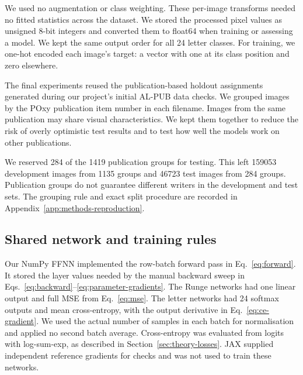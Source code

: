 We used no augmentation or class weighting. These per-image transforms
needed no fitted statistics across the dataset. We stored the processed pixel values as unsigned 8-bit integers and
converted them to float64 when training or assessing a model. We kept the
same output order for all 24 letter classes. For training, we one-hot encoded each image's target: a vector with one
at its class position and zero elsewhere.

The final experiments reused the publication-based holdout assignments
generated during our project's initial AL-PUB data checks. We grouped images by the POxy publication item
number in each filename. Images from the same publication may share visual
characteristics. We kept them together to reduce the risk of overly
optimistic test results and to test how well the models work on other
publications.

We reserved 284 of the 1419 publication groups for testing. This left
159053 development images from 1135 groups and 46723 test images from
284 groups. Publication groups do not guarantee different writers in the
development and test sets. The grouping rule and exact split procedure
are recorded in Appendix~\ref{app:methods-reproduction}.

\subsection{Shared network and training rules}
Our NumPy FFNN implemented the row-batch forward pass in
Eq.~\eqref{eq:forward}. It stored the layer values needed by the manual
backward sweep in Eqs.~\eqref{eq:backward}--\eqref{eq:parameter-gradients}.
The Runge networks had one linear output and full MSE from
Eq.~\eqref{eq:mse}. The letter networks had 24 softmax outputs and
mean cross-entropy, with the output derivative in
Eq.~\eqref{eq:ce-gradient}. We used the actual number of samples in each
batch for normalisation and applied no second batch average.
Cross-entropy was evaluated from logits with log-sum-exp, as described
in Section~\ref{sec:theory-losses}. JAX supplied independent reference
gradients for checks and was not used to train these networks.

